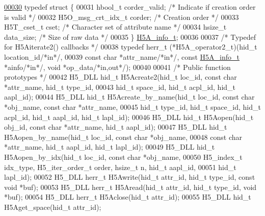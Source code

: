 \begin{DoxyCode}
\hyperlink{struct_h5_a__info__t}{00030} \textcolor{keyword}{typedef} \textcolor{keyword}{struct }\{
00031     hbool\_t             corder\_valid;   \textcolor{comment}{/* Indicate if creation order is valid */}
00032     H5O\_msg\_crt\_idx\_t   corder;         \textcolor{comment}{/* Creation order                 */}
00033     H5T\_cset\_t          cset;           \textcolor{comment}{/* Character set of attribute name */}
00034     hsize\_t             data\_size;      \textcolor{comment}{/* Size of raw data       */}
00035 \} \hyperlink{struct_h5_a__info__t}{H5A\_info\_t};
00036 
00037 \textcolor{comment}{/* Typedef for H5Aiterate2() callbacks */}
00038 \textcolor{keyword}{typedef} herr\_t (*H5A\_operator2\_t)(hid\_t location\_id\textcolor{comment}{/*in*/},
00039     \textcolor{keyword}{const} \textcolor{keywordtype}{char} *attr\_name\textcolor{comment}{/*in*/}, \textcolor{keyword}{const} \hyperlink{struct_h5_a__info__t}{H5A\_info\_t} *ainfo\textcolor{comment}{/*in*/}, \textcolor{keywordtype}{void} *op\_data\textcolor{comment}{/*in,out*/});
00040 
00041 \textcolor{comment}{/* Public function prototypes */}
00042 H5\_DLL hid\_t   H5Acreate2(hid\_t loc\_id, \textcolor{keyword}{const} \textcolor{keywordtype}{char} *attr\_name, hid\_t type\_id,
00043     hid\_t space\_id, hid\_t acpl\_id, hid\_t aapl\_id);
00044 H5\_DLL hid\_t   H5Acreate\_by\_name(hid\_t loc\_id, \textcolor{keyword}{const} \textcolor{keywordtype}{char} *obj\_name, \textcolor{keyword}{const} \textcolor{keywordtype}{char} *attr\_name,
00045     hid\_t type\_id, hid\_t space\_id, hid\_t acpl\_id, hid\_t aapl\_id, hid\_t lapl\_id);
00046 H5\_DLL hid\_t   H5Aopen(hid\_t obj\_id, \textcolor{keyword}{const} \textcolor{keywordtype}{char} *attr\_name, hid\_t aapl\_id);
00047 H5\_DLL hid\_t   H5Aopen\_by\_name(hid\_t loc\_id, \textcolor{keyword}{const} \textcolor{keywordtype}{char} *obj\_name,
00048     \textcolor{keyword}{const} \textcolor{keywordtype}{char} *attr\_name, hid\_t aapl\_id, hid\_t lapl\_id);
00049 H5\_DLL hid\_t   H5Aopen\_by\_idx(hid\_t loc\_id, \textcolor{keyword}{const} \textcolor{keywordtype}{char} *obj\_name,
00050     H5\_index\_t idx\_type, H5\_iter\_order\_t order, hsize\_t n, hid\_t aapl\_id,
00051     hid\_t lapl\_id);
00052 H5\_DLL herr\_t  H5Awrite(hid\_t attr\_id, hid\_t type\_id, \textcolor{keyword}{const} \textcolor{keywordtype}{void} *buf);
00053 H5\_DLL herr\_t  H5Aread(hid\_t attr\_id, hid\_t type\_id, \textcolor{keywordtype}{void} *buf);
00054 H5\_DLL herr\_t  H5Aclose(hid\_t attr\_id);
00055 H5\_DLL hid\_t   H5Aget\_space(hid\_t attr\_id);

\end{DoxyCode}
